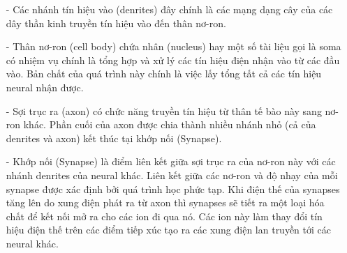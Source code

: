 \begin{itemize}
\item[-]Các nhánh tín hiệu vào (denrites) đây chính là các mạng dạng cây của các dây thần kinh truyền tín hiệu vào đến thân nơ-ron.
\item[-] Thân nơ-ron (cell body) chứa nhân (nucleus) hay một số tài liệu gọi là soma có nhiệm vụ chính là tổng hợp và xử lý các tín hiệu điện nhận vào từ các đầu vào. Bản chất của quá trình này chính là việc lấy tổng tất cả các tín hiệu neural nhận được.

\item[-]Sợi trục ra (axon) có chức năng truyền tín hiệu từ thân tế bào này sang nơ-ron khác. Phần cuối của axon được chia thành nhiều nhánh nhỏ (cả của denrites và axon) kết thúc tại khớp nối (Synapse).
\item[-]Khớp nối (Synapse) là điểm liên kết giữa sợi trục ra của nơ-ron này với các nhánh denrites của neural khác. Liên kết giữa các nơ-ron và độ nhạy của mỗi synapse được xác định bởi quá trình học phức tạp. Khi điện thế của synapses tăng lên do xung điện phát ra từ axon thì synapses sẽ tiết ra một loại hóa chất để kết nối mở ra cho các ion đi qua nó. Các ion này làm thay đổi tín hiệu điện thế trên các điểm tiếp xúc tạo ra các xung điện lan truyền tới các neural khác.
\end{itemize}

